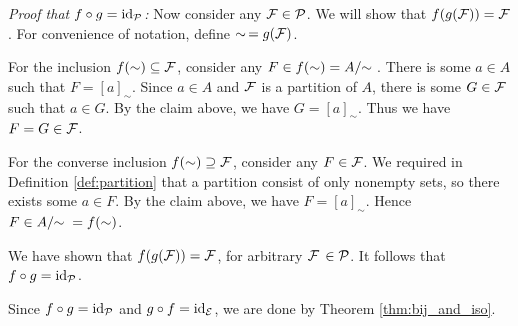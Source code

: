 \documentclass[12pt]{article}
\newcommand{\REL}{\sim}
\newcommand{\MODREL}[1]{#1/\hspace{-3pt}\REL{}}
\newcommand{\CLASS}[2]{[#1]_{#2}}
\newcommand{\id}[1]{\textrm{id}_{#1}}
\begin{document}
{\textit{Proof that $\corr\circ\corrinv =\id{\partsA}$:}
Now consider any $\mathcal{F}\in\mathcal{P}$. We will show that $f(g(\mathcal{F}))=\mathcal{F}$.
For convenience of notation, define $\REL\,=\corrinv(\part)$.

For the inclusion $\corr(\REL)\subseteq\part$, consider any $F\in \corr(\REL)=\MODREL{A}$.
There is some $a\in A$ such that $F=\CLASS{a}{\REL}$.
Since $a\in A$ and $\mathcal{F}$ is a partition of $A$, there is some $G\in \mathcal{F}$ such that $a\in G$.
By the claim above, we have $G=\CLASS{a}{\REL}$. Thus we have $F=G\in \mathcal{F}$.

For the converse inclusion $\corr(\REL)\supseteq\part$, consider any $F\in\mathcal{F}$.
We required in Definition \ref{def:partition}
that a partition consist of only nonempty sets,
so there exists some $a\in F$.
By the claim above, we have $F=\CLASS{a}{\REL}$. Hence $F\in\MODREL{A}=\corr(\REL)$.

We have shown that $f(g(\mathcal{F}))=\mathcal{F}$, for arbitrary $\mathcal{F}\,\in\mathcal{P}$.
It follows that $\corr\circ\corrinv =\id{\partsA}$.

Since $\corr\circ\corrinv =\id{\partsA}$ and $\corrinv\circ\corr =\id{\eqrelnsA}$, we are done by Theorem \ref{thm:bij_and_iso}.
}
\end{document}
